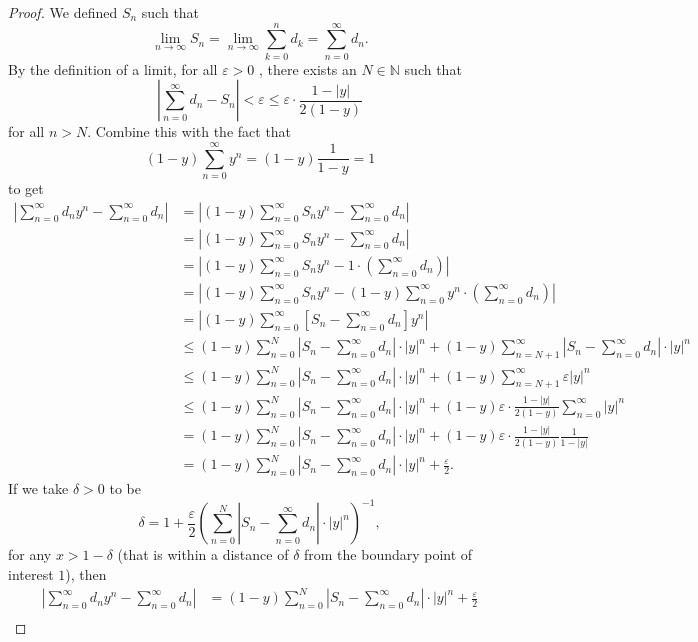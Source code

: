 \documentclass{article}
\newcommand{\N}{\mathbb{N}}
\theoremstyle{definition}
\begin{document}
\begin{proof}
	We defined $S_n$ such that $$ \lim\limits_{n\to\infty}S_n= \lim\limits_{n\to\infty} \sum_{k=0}^{n}d_k = \sum_{n=0}^\infty d_n.$$ By the definition of a limit, for all $ \varepsilon >0$ , there exists an $ N\in\N $ such that $$\left\lvert\sum_{n=0}^\infty d_n-S_n\right\rvert<\varepsilon \le  \varepsilon\cdot\frac{1-|y|}{2(1-y)}$$ for all $ n>N $. Combine this with the fact that  $$(1-y)\sum_{n=0}^\infty y^n = (1-y)\frac{1}{1-y} = 1$$ to get 
	\begin{align*}
		\left\lvert\sum_{n=0}^{\infty}d_ny^n -  \sum_{n=0}^{\infty}d_n\right\rvert & = \left\lvert(1-y)\sum_{n=0}^{\infty}S_ny^n - \sum_{n=0}^{\infty}d_n\right\rvert\\
		&= \left\lvert(1-y)\sum_{n=0}^{\infty}S_ny^n - \sum_{n=0}^{\infty}d_n\right\rvert\\
		&= \left\lvert(1-y)\sum_{n=0}^{\infty}S_ny^n - 1\cdot\left(\sum_{n=0}^{\infty}d_n\right)\right\rvert\\
		&= \left\lvert(1-y)\sum_{n=0}^{\infty}S_ny^n - (1-y)\sum_{n=0}^{\infty}y^n\cdot\left(\sum_{n=0}^{\infty}d_n\right)\right\rvert\\
		&= \left\lvert(1-y)\sum_{n=0}^{\infty}\left[S_n-\sum_{n=0}^{\infty}d_n\right]y^n \right\rvert\\
		& \le (1-y)\sum_{n=0}^{N}\left\lvert S_n-\sum_{n=0}^{\infty}d_n \right\rvert\cdot|y|^n + (1-y)\sum_{n=N+1}^{\infty}\left\lvert S_n-\sum_{n=0}^{\infty}d_n \right\rvert\cdot|y|^n \\ 
		& \le (1-y)\sum_{n=0}^{N}\left\lvert S_n-\sum_{n=0}^{\infty}d_n \right\rvert\cdot|y|^n + (1-y)\sum_{n=N+1}^{\infty}\varepsilon|y|^n \\ & \le (1-y)\sum_{n=0}^{N}\left\lvert S_n-\sum_{n=0}^{\infty}d_n \right\rvert\cdot|y|^n + (1-y)\varepsilon\cdot\frac{1-|y|}{2(1-y)}\sum_{n=0}^{\infty}|y|^n \\ & = (1-y)\sum_{n=0}^{N}\left\lvert S_n-\sum_{n=0}^{\infty}d_n \right\rvert\cdot|y|^n + (1-y)\varepsilon\cdot\frac{1-|y|}{2(1-y)} \frac{1}{1-|y|} \\ & = (1-y)\sum_{n=0}^{N}\left\lvert S_n-\sum_{n=0}^{\infty}d_n \right\rvert\cdot|y|^n + \frac{\varepsilon}{2}.
	\end{align*}
	If we take $ \delta  > 0 $ to be $$ \delta = 1 + \frac{\varepsilon}{2}\left(\sum_{n=0}^{N}\left\lvert S_n-\sum_{n=0}^{\infty}d_n \right\rvert\cdot|y|^n\right)^{-1},$$ for any $ x > 1 - \delta $ (that is within a distance of $ \delta $ from the boundary point of interest $ 1 $), then 
	\begin{align*}
		\left\lvert\sum_{n=0}^{\infty}d_ny^n -  \sum_{n=0}^{\infty}d_n\right\rvert & = (1-y)\sum_{n=0}^{N}\left\lvert S_n-\sum_{n=0}^{\infty}d_n \right\rvert\cdot|y|^n + \frac{\varepsilon}{2} \\

\end{align*}
\end{proof}
\end{document}
